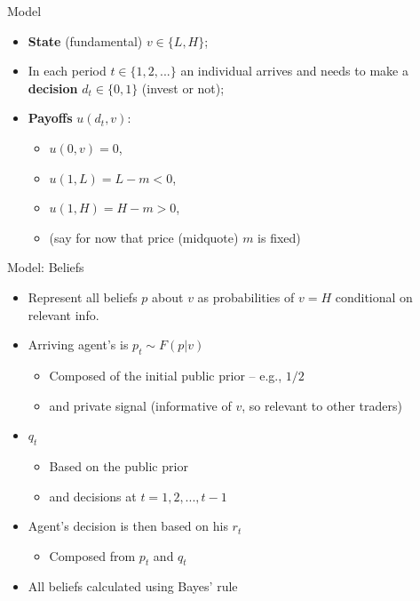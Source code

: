 \documentclass[english,10pt
,aspectratio=169
]{beamer}
\begin{document}
\begin{frame}{Model}
	\begin{itemize}
		\item \textbf{State} (fundamental) $v \in \{L,H\}$;
		\item In each period $t \in \{1,2, ...\}$ an individual arrives and needs to make a \textbf{decision} $d_t \in \{0,1\}$ (invest or not);
		\item \textbf{Payoffs} $u(d_t,v)$:
		\begin{itemize}
			\item $u(0,v) = 0$,
			\item $u(1,L) = L-m < 0$,
			\item $u(1,H) = H-m > 0$,
			\item (say for now that price (midquote) $m$ is fixed)
		\end{itemize}
	\end{itemize}
\end{frame}


\begin{frame}{Model: Beliefs}
	\begin{itemize}
		\item Represent all beliefs $p$ about $v$ as probabilities of $v=H$ conditional on relevant info.
		\item Arriving agent's  is $p_t \sim F(p|v)$
		\begin{itemize}
			\item Composed of the initial public prior -- e.g., $1/2$
			\item and private signal (informative of $v$, so relevant to other traders)
		\end{itemize}
		\item {} $q_t$
		\begin{itemize}
			\item Based on the public prior
			\item and decisions at $t = 1,2,...,t-1$
		\end{itemize}
		\item Agent's decision is then based on his  $r_t$
		\begin{itemize}
			\item Composed from $p_t$ and $q_t$
		\end{itemize}
		\item All beliefs calculated using Bayes' rule
	\end{itemize}
\end{frame}
\end{document}
